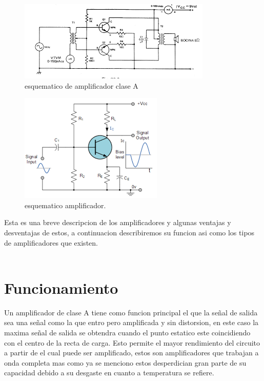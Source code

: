 \documentclass[12pt]{article}
\begin{document}
\begin{figure}[htp]
\centering
\includegraphics[scale=0.50]{imagenes/images.png}
\caption{esquematico de amplificador clase A}
\label{}
\end{figure}
\begin{figure}[htp]
\centering
\includegraphics[scale=0.50]{imagenes/1.png}
\caption{esquematico amplificador.}
\label{}
\end{figure}
Esta es una breve descripcion de los amplificadores y algunas ventajas y desventajas de estos, a continuacion describiremos su funcion asi como los tipos de amplificadores que existen.\\\\

\maketitle
\section{Funcionamiento}
Un amplificador de clase A tiene como funcion principal el que la señal de salida sea una señal como la que entro pero amplificada y sin distorsion, en este caso la maxima señal de salida se obtendra cuando el punto estatico este coincidiendo con el centro de la recta de carga.
Esto permite el mayor rendimiento del circuito a partir de el cual puede ser amplificado, estos son amplificadores que trabajan a onda completa mas como ya se menciono estos desperdician gran parte de su capacidad debido a su desgaste en cuanto a temperatura se refiere.
\end{document}
